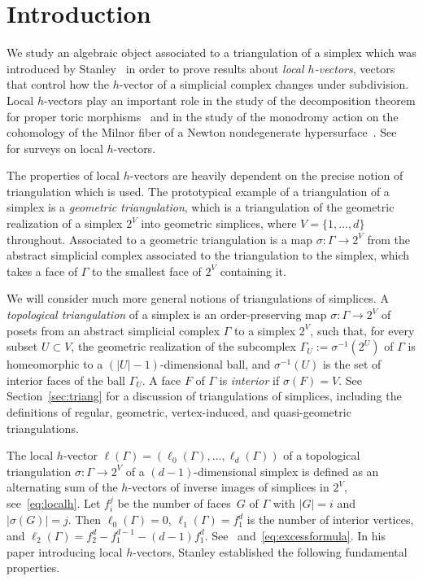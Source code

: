 \section{Introduction}

We study an algebraic object associated to a triangulation of a simplex which was introduced by Stanley~\cite{Stanleylocalh} in order to prove results about \emph{local $h$-vectors}, vectors that control how the $h$-vector of a simplicial complex changes under subdivision. 
Local $h$-vectors play an important role in the study of the decomposition theorem for proper toric morphisms~\cite{deCataldoMiglioriniMustata18,KatzStapledon16} and in the study of the monodromy action on the cohomology of the Milnor fiber of a Newton nondegenerate hypersurface~\cite{Stapledon17,LPS2}.
See~\cite{ChanSurvey,AthanasiadisSurvey} for surveys  on local $h$-vectors. 

The properties of local $h$-vectors are heavily dependent on the precise notion of triangulation which is used. The prototypical example of a triangulation of a simplex is a \emph{geometric triangulation}, which is a triangulation of the geometric realization of a simplex $2^V$ into geometric simplices, where $V = \{ 1,\ldots, d\}$ throughout. 
Associated to a geometric triangulation is a map $\sigma \colon \Gamma \to 2^V$ from the abstract simplicial complex associated to the triangulation to the simplex, which takes a face of $\Gamma$ to the smallest face of $2^V$ containing it. 

We will consider much more general notions of triangulations of simplices. 
A \emph{topological triangulation} of a simplex is an order-preserving  map $\sigma \colon \Gamma \to 2^V$ of posets from an abstract simplicial complex $\Gamma$ to a simplex $2^V$, such that, for every subset $U \subset V$, 
the geometric realization of the subcomplex $\Gamma_U := \sigma^{-1}(2^U)$ of $\Gamma$ is homeomorphic to a $(|U| - 1)$-dimensional ball, and $\sigma^{-1}(U)$ is the set of interior faces of the ball $\Gamma_U$. 
A face $F$ of $\Gamma$ is \emph{interior} if $\sigma(F) = V$. 
See Section~\ref{sec:triang} for a discussion of triangulations of simplices, including the definitions of regular, geometric, vertex-induced, and quasi-geometric triangulations. 

The {local $h$-vector} $\ell(\Gamma) = (\ell_0(\Gamma), \dotsc, \ell_d(\Gamma))$ of a topological triangulation \mbox{$\sigma \colon \Gamma \to 2^V$} of a $(d-1)$-dimensional simplex is defined as an alternating sum of the $h$-vectors of inverse images of simplices in $2^V$, see~\eqref{eq:localh}. 
Let $f_i^j$ be the number of faces~$G$ of $\Gamma$ with $|G| = i$ and $|\sigma(G)| = j$. Then $\ell_0(\Gamma) = 0$, $\ell_1(\Gamma) = f_1^d$ is the number of interior vertices, and $\ell_2(\Gamma) = f_2^d - f_1^{d-1} - (d-1)f_1^{d}$. See~\cite[Example 2.3]{Stanleylocalh} and~\eqref{eq:excessformula}. In his paper introducing local $h$-vectors, Stanley established the following fundamental properties. 

